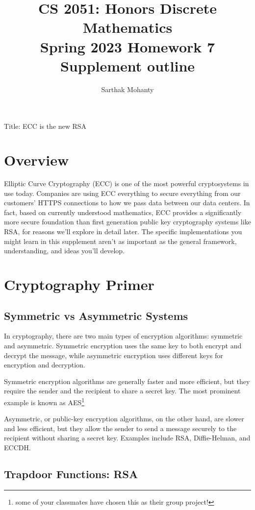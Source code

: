 \documentclass{article}
\title{\vspace{-1cm}CS 2051: Honors Discrete Mathematics \\Spring 2023 Homework 7 Supplement outline}
\author{Sarthak Mohanty }
\date{}
\begin{document}
\maketitle

Title: ECC is the new RSA
\section*{Overview}

Elliptic Curve Cryptography (ECC) is one of the most powerful cryptosystems in use today. Companies are using ECC everything to secure everything from our customers' HTTPS connections to how we pass data between our data centers. In fact, based on currently understood mathematics, ECC provides a significantly more secure foundation than first generation public key cryptography systems like RSA, for reasons we'll explore in detail later. The specific implementations you might learn in this supplement aren't as important as the general framework, understanding, and ideas you'll develop.


\section*{Cryptography Primer}


\subsection*{Symmetric vs Asymmetric Systems}

In cryptography, there are two main types of encryption algorithms: symmetric and asymmetric. Symmetric encryption uses the same key to both encrypt and decrypt the message, while asymmetric encryption uses different keys for encryption and decryption.

Symmetric encryption algorithms are generally faster and more efficient, but they require the sender and the recipient to share a secret key. The most prominent example is known as AES\footnote{some of your classmates have chosen this as their group project!} 


Asymmetric, or public-key encryption algorithms, on the other hand, are slower and less efficient, but they allow the sender to send a message securely to the recipient without sharing a secret key. Examples include RSA, Diffie-Helman, and ECCDH.


\subsection*{Trapdoor Functions: RSA}
\end{document}
